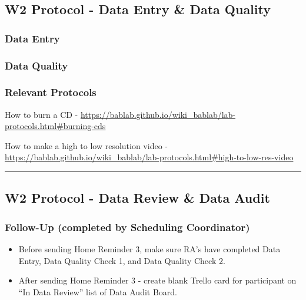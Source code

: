 \documentclass[
]{book}
\providecommand{\tightlist}{%
  \setlength{\itemsep}{0pt}\setlength{\parskip}{0pt}}
\begin{document}
\hypertarget{w2-protocol---data-entry-data-quality}{%
\subsection{W2 Protocol - Data Entry \& Data Quality}\label{w2-protocol---data-entry-data-quality}}

\hypertarget{data-entry-6}{%
\subsubsection{Data Entry}\label{data-entry-6}}

\hypertarget{data-quality-4}{%
\subsubsection{Data Quality}\label{data-quality-4}}

\hypertarget{relevant-protocols-1}{%
\subsubsection{Relevant Protocols}\label{relevant-protocols-1}}

How to burn a CD - \url{https://bablab.github.io/wiki_bablab/lab-protocols.html\#burning-cds}

How to make a high to low resolution video - \url{https://bablab.github.io/wiki_bablab/lab-protocols.html\#high-to-low-res-video}

\begin{center}\rule{0.5\linewidth}{0.5pt}\end{center}

\hypertarget{w2-protocol---data-review-data-audit}{%
\subsection{W2 Protocol - Data Review \& Data Audit}\label{w2-protocol---data-review-data-audit}}

\hypertarget{follow-up-completed-by-scheduling-coordinator-2}{%
\subsubsection{Follow-Up (completed by Scheduling Coordinator)}\label{follow-up-completed-by-scheduling-coordinator-2}}

\begin{itemize}
\tightlist
\item
  Before sending Home Reminder 3, make sure RA's have completed Data Entry, Data Quality Check 1, and Data Quality Check 2.
\item
  After sending Home Reminder 3 - create blank Trello card for participant on ``In Data Review'' list of Data Audit Board.
\end{itemize}
\end{document}
